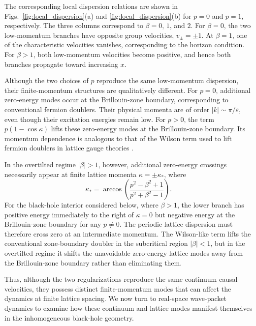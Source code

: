 \documentclass[reprint,amsmath,amssymb,aps,prb,showkeys,superscriptaddress]{revtex4-2}
\begin{document}
The corresponding local dispersion relations are shown in
Figs.~\ref{fig:local_dispersion}(a) and
\ref{fig:local_dispersion}(b) for $p=0$ and $p=1$, respectively.
The three columns correspond to $\beta=0$, $1$, and $2$.
For $\beta=0$, the two low-momentum branches have opposite group
velocities, $v_{\pm}=\pm1$. At $\beta=1$, one of the
characteristic velocities vanishes, corresponding to the horizon
condition. For $\beta>1$, both low-momentum velocities become
positive, and hence both branches propagate toward increasing $x$.

Although the two choices of $p$ reproduce the same low-momentum
dispersion, their finite-momentum structures are qualitatively
different. For $p=0$, additional zero-energy modes occur at the
Brillouin-zone boundary, corresponding to conventional fermion
doublers. Their physical momenta are of order
$|k|\sim\pi/\varepsilon$, even though their excitation energies
remain low. For $p>0$, the term $p(1-\cos\kappa)$ lifts these
zero-energy modes at the Brillouin-zone boundary. Its momentum
dependence is analogous to that of the Wilson term used to lift
fermion doublers in lattice gauge theories \cite{Wilson1974}.

In the overtilted regime $|\beta|>1$, however, additional
zero-energy crossings necessarily appear at finite lattice momenta
$\kappa=\pm\kappa_\ast$, where
\begin{equation}
  \kappa_\ast
  =
  \arccos\left(
    \frac{p^2-\beta^2+1}
         {p^2+\beta^2-1}
  \right).
  \label{eq:finite_momentum_crossing}
\end{equation}
For the black-hole interior considered below, where $\beta>1$, the
lower branch has positive energy immediately to the right of
$\kappa=0$ but negative energy at the Brillouin-zone boundary for
any $p\neq0$. The periodic lattice dispersion must therefore cross
zero at an intermediate momentum. The Wilson-like term lifts the
conventional zone-boundary doubler in the subcritical region
$|\beta|<1$, but in the overtilted regime it shifts the unavoidable
zero-energy lattice modes away from the Brillouin-zone boundary
rather than eliminating them.

Thus, although the two regularizations reproduce the same continuum
causal velocities, they possess distinct finite-momentum modes that
can affect the dynamics at finite lattice spacing. We now turn to
real-space wave-packet dynamics to examine how these continuum and
lattice modes manifest themselves in the inhomogeneous black-hole
geometry.
\end{document}
